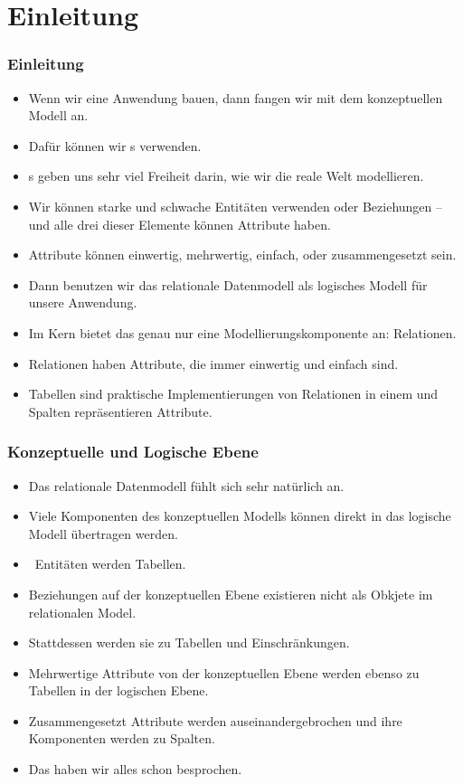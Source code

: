 \documentclass[aspectratio=169,mathserif,notheorems]{beamer}%
\subtitle{38.~Logisches Schema:~Schwache Entitäten}%
\begin{document}
%
%
\startPresentation%
%
\section{Einleitung}%
%
\begin{frame}%
\frametitle{Einleitung}%
\begin{itemize}%
\item Wenn wir eine Anwendung bauen, dann fangen wir mit dem konzeptuellen Modell an.%
%
\item<2-> Dafür können wir s verwenden.%
%
\item<3-> s geben uns sehr viel Freiheit darin, wie wir die reale Welt modellieren.%
%
\item<4-> Wir können starke und schwache Entitäten verwenden oder Beziehungen -- und alle drei dieser Elemente können Attribute haben.%
%
\item<5-> Attribute können einwertig, mehrwertig, einfach, oder zusammengesetzt sein.%
%
\item<6-> Dann benutzen wir das relationale Datenmodell als logisches Modell für unsere Anwendung.%
%
\item<7-> Im Kern bietet das genau nur eine Modellierungskomponente an: Relationen.%
%
\item<8-> Relationen haben Attribute, die immer einwertig und einfach sind.%
%
\item<9-> Tabellen sind praktische Implementierungen von Relationen in einem  und Spalten repräsentieren Attribute.%
%
\end{itemize}%
\end{frame}%
%
\begin{frame}%
\frametitle{Konzeptuelle und Logische Ebene}%
\begin{itemize}%
\item Das relationale Datenmodell fühlt sich sehr natürlich an.%
\item<2-> Viele Komponenten des konzeptuellen Modells können direkt in das logische Modell übertragen werden.%
\item<3-> \DEZB~Entitäten werden Tabellen.
%
\item<4-> Beziehungen auf der konzeptuellen Ebene existieren nicht als Obkjete im relationalen Model.
\item<5-> Stattdessen werden sie zu Tabellen und Einschränkungen.%
\item<6-> Mehrwertige Attribute von der konzeptuellen Ebene werden ebenso zu Tabellen in der logischen Ebene.%
\item<7-> Zusammengesetzt Attribute werden auseinandergebrochen und ihre Komponenten werden zu Spalten.%
\item<8-> Das haben wir alles schon besprochen.%
\end{itemize}%
\end{frame}%
\end{document}
